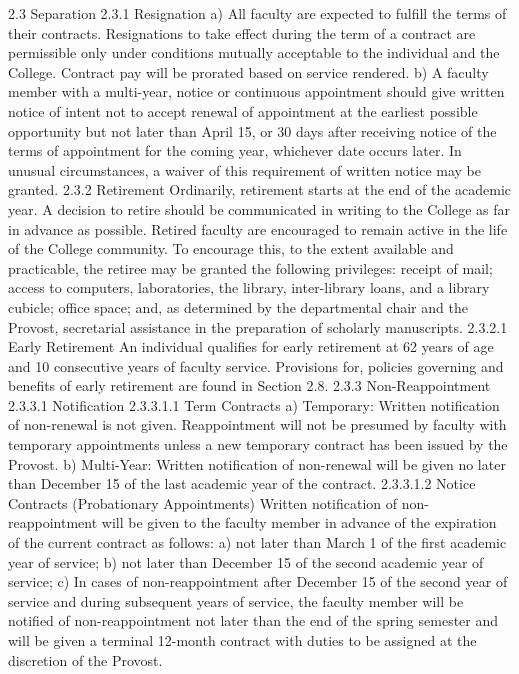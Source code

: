 \documentclass[letterpaper, 11pt]{article}
\begin{document}
	2.3 Separation
	2.3.1 Resignation
	a) All faculty are expected to fulfill the terms of their contracts.  Resignations to take effect during the term of a contract are permissible only under conditions mutually acceptable to the individual and the College.  Contract pay will be prorated based on service rendered.
	b) A faculty member with a multi-year, notice or continuous appointment should give written notice of intent not to accept renewal of appointment at the earliest possible opportunity but not later than April 15, or 30 days after receiving notice of the terms of appointment for the coming year, whichever date occurs later. In unusual circumstances, a waiver of this requirement of written notice may be granted.
	2.3.2 Retirement
	Ordinarily, retirement starts at the end of the academic year.  A decision to retire should be communicated in writing to the College as far in advance as possible.  Retired faculty are encouraged to remain active in the life of the College community.  To encourage this, to the extent available and practicable, the retiree may be granted the following privileges:  receipt of mail; access to computers, laboratories, the library, inter-library loans, and a library cubicle; office space; and, as determined by the departmental chair and the Provost, secretarial assistance in the preparation of scholarly manuscripts.
	2.3.2.1 Early Retirement
	An individual qualifies for early retirement at 62 years of age and 10 consecutive years of faculty service.  Provisions for, policies governing and benefits of early retirement are found in Section 2.8.
	2.3.3 Non-Reappointment
	2.3.3.1 Notification
	2.3.3.1.1 Term Contracts
	a) Temporary: Written notification of non-renewal is not given.  Reappointment will not be presumed by faculty with temporary appointments unless a new temporary contract has been issued by the Provost.
	b) Multi-Year: Written notification of non-renewal will be given no later than December 15 of the last academic year of the contract.
	2.3.3.1.2 Notice Contracts (Probationary Appointments)
	Written notification of non-reappointment will be given to the faculty member in advance of the expiration of the current contract as follows:
	a) not later than March 1 of the first academic year of service;
	b) not later than December 15 of the second academic year of service;
	c) In cases of non-reappointment after December 15 of the second year of service and during subsequent years of service, the faculty member will be notified of non-reappointment not later than the end of the spring semester and will be given a terminal 12-month contract with duties to be assigned at the discretion of the Provost.
\end{document}
